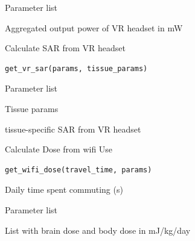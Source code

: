 \documentclass[a4paper]{book}
\begin{document}
%
\begin{Arguments}
\begin{ldescription}
\item[\code{params}] Parameter list
\end{ldescription}
\end{Arguments}
%
\begin{Value}
Aggregated output power of VR headset in mW
\end{Value}
%
\begin{Description}
Calculate SAR from VR headset
\end{Description}
%
\begin{Usage}
\begin{verbatim}
get_vr_sar(params, tissue_params)
\end{verbatim}
\end{Usage}
%
\begin{Arguments}
\begin{ldescription}
\item[\code{params}] Parameter list

\item[\code{tissue\_params}] Tissue params
\end{ldescription}
\end{Arguments}
%
\begin{Value}
tissue-specific SAR from VR headset
\end{Value}
%
\begin{Description}
Calculate Dose from wifi Use
\end{Description}
%
\begin{Usage}
\begin{verbatim}
get_wifi_dose(travel_time, params)
\end{verbatim}
\end{Usage}
%
\begin{Arguments}
\begin{ldescription}
\item[\code{travel\_time}] Daily time spent commuting (s)

\item[\code{params}] Parameter list
\end{ldescription}
\end{Arguments}
%
\begin{Value}
List with brain dose and body dose in mJ/kg/day
\end{Value}
\end{document}
